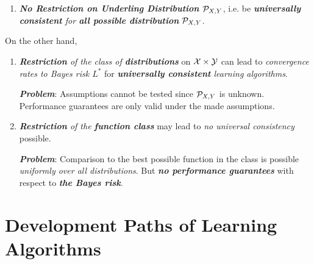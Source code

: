 \documentclass[11pt]{article}
\begin{document}
\begin{itemize}
\begin{remark}
\begin{enumerate}
\item \emph{\textbf{No Restriction on Underling Distribution ${\mathcal P}_{X, Y}$}}, i.e. be \emph{\textbf{universally consistent} for \textbf{all possible distribution} ${\mathcal P}_{X, Y}$}.
\end{enumerate}
On the other hand, 
\begin{enumerate}
\item \emph{\textbf{Restriction} of the class of \textbf{distributions}} on ${\mathcal X} \times {\mathcal Y}$ can lead to \emph{convergence rates to Bayes risk $L^{*}$} for \emph{\textbf{universally consistent} learning algorithms}.

\emph{\textbf{Problem}}: Assumptions cannot be tested since ${\mathcal P}_{X, Y}$ is unknown. Performance guarantees are only valid under the made assumptions.

\item \emph{\textbf{Restriction} of the \textbf{function class}} may lead to \emph{no universal consistency} possible.

\emph{\textbf{Problem}}:  Comparison to the best possible function in the class is possible \emph{uniformly over all distributions}. But \emph{\textbf{no performance guarantees}} with respect to \emph{\textbf{the Bayes risk}}.
\end{enumerate}
\end{remark}
\end{itemize}


\section{Development Paths of  Learning Algorithms}

%
%
\end{document}
